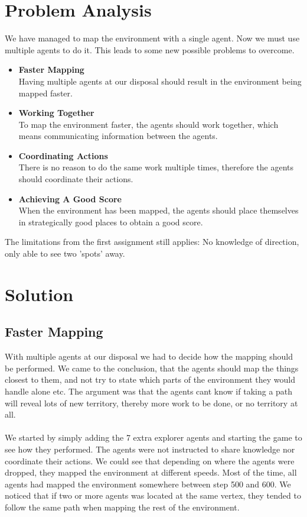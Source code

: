 \documentclass[11pt]{report}
\begin{document}
\section*{Problem Analysis}
We have managed to map the environment with a single agent. Now we must use multiple agents to do it. This leads to some new possible problems to overcome.
\begin{itemize}
	\item \textbf{Faster Mapping}\\
	Having multiple agents at our disposal should result in the environment being mapped faster.
	\item \textbf{Working Together}\\
	To map the environment faster, the agents should work together, which means communicating information between the agents.
	\item \textbf{Coordinating Actions}\\
	There is no reason to do the same work multiple times, therefore the agents should coordinate their actions.
	\item \textbf{Achieving A Good Score}\\
	When the environment has been mapped, the agents should place themselves in strategically good places to obtain a good score.
\end{itemize}

The limitations from the first assignment still applies: No knowledge of direction, only able to see two 'spots' away.

\section*{Solution}
\subsection*{Faster Mapping}
With multiple agents at our disposal we had to decide how the mapping should be performed. We came to the conclusion, that the agents should map the things closest to them, and not try to state which parts of the environment they would handle alone etc. The argument was that the agents cant know if taking a path will reveal lots of new territory, thereby more work to be done, or no territory at all.\\
\\
We started by simply adding the 7 extra explorer agents and starting the game to see how they performed. The agents were not instructed to share knowledge nor coordinate their actions. We could see that depending on where the agents were dropped, they mapped the environment at different speeds. Most of the time, all agents had mapped the environment somewhere between step 500 and 600. We noticed that if two or more agents was located at the same vertex, they tended to follow the same path when mapping the rest of the environment.
\end{document}
